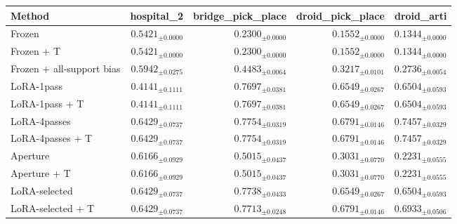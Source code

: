 \begin{tabular}{lrrrr}
\toprule
Method & hospital\_2 & bridge\_pick\_place & droid\_pick\_place & droid\_arti \\
\midrule
Frozen & $0.5421_{\pm 0.0000}$ & $0.2300_{\pm 0.0000}$ & $0.1552_{\pm 0.0000}$ & $0.1344_{\pm 0.0000}$ \\
Frozen + T & $0.5421_{\pm 0.0000}$ & $0.2300_{\pm 0.0000}$ & $0.1552_{\pm 0.0000}$ & $0.1344_{\pm 0.0000}$ \\
Frozen + all-support bias & $0.5942_{\pm 0.0275}$ & $0.4483_{\pm 0.0064}$ & $0.3217_{\pm 0.0101}$ & $0.2736_{\pm 0.0054}$ \\
LoRA-1pass & $0.4141_{\pm 0.1111}$ & $0.7697_{\pm 0.0381}$ & $0.6549_{\pm 0.0267}$ & $0.6504_{\pm 0.0593}$ \\
LoRA-1pass + T & $0.4141_{\pm 0.1111}$ & $0.7697_{\pm 0.0381}$ & $0.6549_{\pm 0.0267}$ & $0.6504_{\pm 0.0593}$ \\
LoRA-4passes & $0.6429_{\pm 0.0737}$ & $0.7754_{\pm 0.0319}$ & $0.6791_{\pm 0.0146}$ & $0.7457_{\pm 0.0329}$ \\
LoRA-4passes + T & $0.6429_{\pm 0.0737}$ & $0.7754_{\pm 0.0319}$ & $0.6791_{\pm 0.0146}$ & $0.7457_{\pm 0.0329}$ \\
Aperture & $0.6166_{\pm 0.0929}$ & $0.5015_{\pm 0.0437}$ & $0.3031_{\pm 0.0770}$ & $0.2231_{\pm 0.0555}$ \\
Aperture + T & $0.6166_{\pm 0.0929}$ & $0.5015_{\pm 0.0437}$ & $0.3031_{\pm 0.0770}$ & $0.2231_{\pm 0.0555}$ \\
LoRA-selected & $0.6429_{\pm 0.0737}$ & $0.7738_{\pm 0.0433}$ & $0.6549_{\pm 0.0267}$ & $0.6504_{\pm 0.0593}$ \\
LoRA-selected + T & $0.6429_{\pm 0.0737}$ & $0.7713_{\pm 0.0248}$ & $0.6791_{\pm 0.0146}$ & $0.6933_{\pm 0.0506}$ \\
\bottomrule
\end{tabular}
